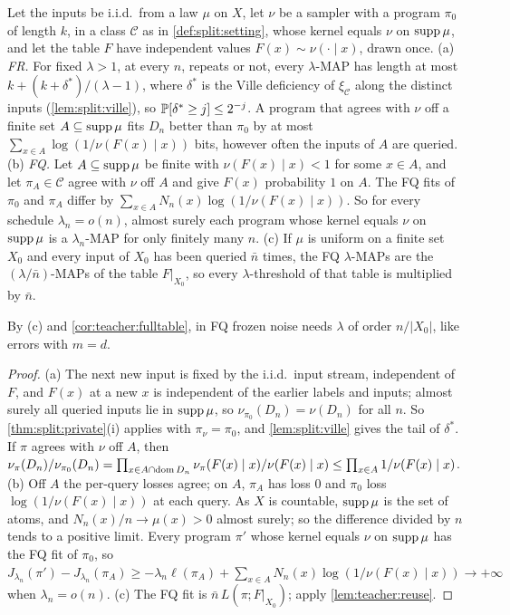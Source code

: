 \begin{proposition}\label{prop:teacher:frozen}
Let the inputs be i.i.d.\ from a law $\mu$ on $X$, let $\nu$ be a sampler with a program $\pi_0$ of length $k$, in a class $\mathcal C$ as in \cref{def:split:setting}, whose kernel equals $\nu$ on $\operatorname{supp}\mu$, and let the table $F$ have independent values $F(x)\sim\nu(\cdot\mid x)$, drawn once.
(a) \emph{FR.} For fixed $\lambda>1$, at every $n$, repeats or not, every $\lambda$-MAP has length at most $k+(k+\delta^*)/(\lambda-1)$, where $\delta^*$ is the Ville deficiency of $\xi_{\mathcal C}$ along the distinct inputs (\cref{lem:split:ville}), so $\mathbb{P}[\delta^*\ge j]\le2^{-j}$. A program that agrees with $\nu$ off a finite set $A\subseteq\operatorname{supp}\mu$ fits $D_n$ better than $\pi_0$ by at most $\sum_{x\in A}\log(1/\nu(F(x)\mid x))$ bits, however often the inputs of $A$ are queried.
(b) \emph{FQ.} Let $A\subseteq\operatorname{supp}\mu$ be finite with $\nu(F(x)\mid x)<1$ for some $x\in A$, and let $\pi_A\in\mathcal C$ agree with $\nu$ off $A$ and give $F(x)$ probability $1$ on $A$. The FQ fits of $\pi_0$ and $\pi_A$ differ by $\sum_{x\in A}N_n(x)\log(1/\nu(F(x)\mid x))$. So for every schedule $\lambda_n=o(n)$, almost surely each program whose kernel equals $\nu$ on $\operatorname{supp}\mu$ is a $\lambda_n$-MAP for only finitely many $n$.
(c) If $\mu$ is uniform on a finite set $X_0$ and every input of $X_0$ has been queried $\bar n$ times, the FQ $\lambda$-MAPs are the $(\lambda/\bar n)$-MAPs of the table $F|_{X_0}$, so every $\lambda$-threshold of that table is multiplied by $\bar n$.
\end{proposition}

By (c) and \cref{cor:teacher:fulltable}, in FQ frozen noise needs $\lambda$ of order $n/|X_0|$, like errors with $m=d$.

\begin{proof}
(a) The next new input is fixed by the i.i.d.\ input stream, independent of $F$, and $F(x)$ at a new $x$ is independent of the earlier labels and inputs; almost surely all queried inputs lie in $\operatorname{supp}\mu$, so $\nu_{\pi_0}(D_n)=\nu(D_n)$ for all $n$. So \cref{thm:split:private}(i) applies with $\pi_\nu=\pi_0$, and \cref{lem:split:ville} gives the tail of $\delta^*$. If $\pi$ agrees with $\nu$ off $A$, then $\nu_\pi(D_n)/\nu_{\pi_0}(D_n)=\prod_{x\in A\cap\operatorname{dom} D_n}\nu_\pi(F(x)\mid x)/\nu(F(x)\mid x)\le\prod_{x\in A}1/\nu(F(x)\mid x)$.
(b) Off $A$ the per-query losses agree; on $A$, $\pi_A$ has loss $0$ and $\pi_0$ loss $\log(1/\nu(F(x)\mid x))$ at each query. As $X$ is countable, $\operatorname{supp}\mu$ is the set of atoms, and $N_n(x)/n\to\mu(x)>0$ almost surely; so the difference divided by $n$ tends to a positive limit. Every program $\pi'$ whose kernel equals $\nu$ on $\operatorname{supp}\mu$ has the FQ fit of $\pi_0$, so $J_{\lambda_n}(\pi')-J_{\lambda_n}(\pi_A)\ge-\lambda_n\ell(\pi_A)+\sum_{x\in A}N_n(x)\log(1/\nu(F(x)\mid x))\to+\infty$ when $\lambda_n=o(n)$.
(c) The FQ fit is $\bar n\,L(\pi;F|_{X_0})$; apply \cref{lem:teacher:reuse}.
\end{proof}

